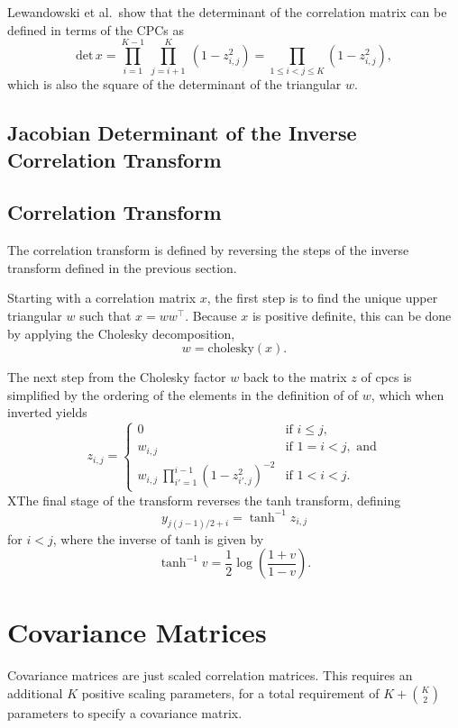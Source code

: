 \documentclass[10pt]{report}
\newcommand{\acronym}[1]{{\sc #1}\xspace}
\newcommand{\CPC}{\acronym{cpc}}
\begin{document}
Lewandowski et al.\ show that the determinant of the correlation
matrix can be defined in terms of the CPCs as
%
\[
\mbox{det} \, x = \prod_{i=1}^{K-1} \ \prod_{j=i+1}^K \ (1 - z_{i,j}^2)
 = \prod_{1 \leq i < j \leq K} (1 - z_{i,j}^2),
\]
which is also the square of the determinant of the triangular $w$.

\subsection{Jacobian Determinant of the Inverse Correlation Transform}

\subsection{Correlation Transform}

The correlation transform is defined by reversing the steps of the
inverse transform defined in the previous section.  

Starting with a correlation matrix $x$, the first step is to find the
unique upper triangular $w$ such that $x = w w^{\top}$.  Because $x$
is positive definite, this can be done by applying the Cholesky
decomposition,
\[
w = \mbox{cholesky}(x).
\]


The next step from the Cholesky factor $w$ back to the matrix $z$ of
{\CPC}s is simplified by the ordering of the elements in the
definition of of $w$, which when inverted yields
%
\[
z_{i,j} =
\left\{
\begin{array}{cl}
0 & \mbox{if } i \leq j,
\\[8pt]
w_{i,j} & \mbox{if } 1 = i < j, \mbox{ and}
\\[8pt]
{w_{i,j}}
\
\prod_{i'=1}^{i-1} \left( 1 - z_{i'\!,j}^2 \right)^{-2}
& \mbox{if } 1 < i < j.
\end{array}
\right.
\]
XThe final stage of the transform reverses the tanh transform, defining
\[
y_{j(j-1)/2 + i} = \tanh^{-1} z_{i,j}
\]
%
for $i < j$, where the inverse of tanh is given by
\[
\tanh^{-1} v = \frac{1}{2} \log \left( \frac{1 + v}{1 - v} \right).
\]






\section{Covariance Matrices}

Covariance matrices are just scaled correlation matrices.  This
requires an additional $K$ positive scaling parameters, for a total
requirement of $K + {K \choose 2}$ parameters to specify a covariance
matrix.  
\end{document}
